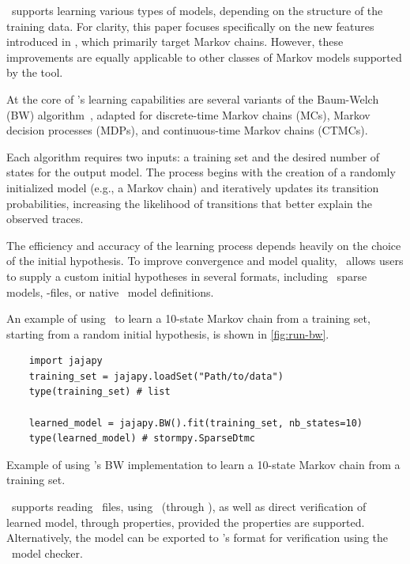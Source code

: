 \Jajapy\ supports learning various types of models, depending on the structure of the training data.
For clarity, this paper focuses specifically on the new features introduced in \JajapyTwo, which primarily target Markov chains.
However, these improvements are equally applicable to other classes of Markov models supported by the tool.

At the core of \Jajapy's learning capabilities are several variants of the Baum-Welch (BW) algorithm~\cite{Baum70,Rabiner89}, adapted for discrete-time Markov chains (MCs), Markov decision processes (MDPs)\cite{BacciILR21}, and continuous-time Markov chains (CTMCs)\cite{BacciILR23}.

Each algorithm requires two inputs: a training set and the desired number of states for the output model.
The process begins with the creation of a randomly initialized model (e.g., a Markov chain) and iteratively updates its transition probabilities, increasing the likelihood of transitions that better explain the observed traces.

The efficiency and accuracy of the learning process depends heavily on the choice of the initial hypothesis.
To improve convergence and model quality, \Jajapy\ allows users to supply a custom initial hypotheses in several formats, including \Stormpy~sparse models, \Prism-files, or native \Jajapy\ model definitions.

An example of using \Jajapy\ to learn a 10-state Markov chain from a training set, starting from a random initial hypothesis, is shown in \autoref{fig:run-bw}.


\begin{listing}[htb!]
    \begin{verbatim} 
    import jajapy
    training_set = jajapy.loadSet("Path/to/data")
    type(training_set) # list 

    learned_model = jajapy.BW().fit(training_set, nb_states=10)
    type(learned_model) # stormpy.SparseDtmc 
    \end{verbatim}
    \caption{Example of using \Jajapy's BW implementation to learn a 10-state Markov chain from a training set.}
    \label{fig:run-bw}
\end{listing}


\Jajapy\ supports reading \Prism\ files, using \Storm\ (through \Stormpy), as well as direct verification of learned model, through properties, provided the properties are supported.
Alternatively, the model can be exported to \Prism's format for verification using the \Prism\ model checker.


